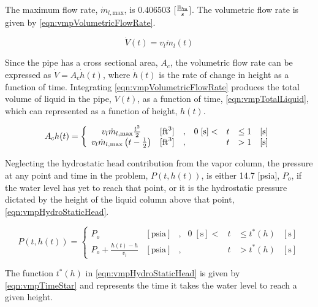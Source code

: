 The maximum flow rate, $\dot{m}_{l,\text{max}}$, is 0.406503 $ [ \frac{\lbm{}}{s} ]$.
The volumetric flow rate is given by \eqref{eqn:vmpVolumetricFlowRate}.

\begin{equation}
\label{eqn:vmpVolumetricFlowRate}
\dot{V}(t) = v_{l} \dot{m}_{l}(t)
\end{equation}

Since the pipe has a cross sectional area, $A_{c}$, the volumetric flow rate can be expressed as $\dot{V} = A_{c} \dot{h}(t)$, where $\dot{h}(t)$ is the rate of change in height as a function of time.
Integrating \eqref{eqn:vmpVolumetricFlowRate} produces the total volume of liquid in the pipe, $V(t)$, as a function of time, \eqref{eqn:vmpTotalLiquid}, which can represented as a function of height, $h(t)$.

\begin{equation}
\label{eqn:vmpTotalLiquid}
A_{c} h(t) = 
 \left\{
\begin{array}{cclrcll}
v_{l} \dot{m}_{l,\text{max}}\frac{t^{2}}{2} & [ \text{ft}^{3} ] & , & 0\; [\text{s}] < & t & \leq 1 & [\text{s}] \\
v_{l} \dot{m}_{l,\text{max}} \left( t - \onehalf  \right) & [ \text{ft}^{3} ] & , &                  & t & > 1    & [\text{s}]
\end{array}\right.
\end{equation}

Neglecting the hydrostatic head contribution from the vapor column, the pressure at any point and time in the problem, $P(t, h(t))$, is either 14.7 [psia], $P_o$, if the water level has yet to reach that point, or it is the hydrostatic pressure dictated by the height of the liquid column above that point, \eqref{eqn:vmpHydroStaticHead}.

\begin{equation}
\label{eqn:vmpHydroStaticHead}
P(t, h(t))= 
 \left\{
\begin{array}{cclrcll}
P_o & [ \text{psia} ] & , & 0\; [\text{s}] < & t & \leq t^{*}(h) & [\text{s}] \\
P_o + \frac{ h(t) - h }{ v_{l} } & [ \text{psia} ] & , &  & t & > t^{*}(h) & [\text{s}]
\end{array}\right.
\end{equation}

The function $t^{*}(h)$ in \eqref{eqn:vmpHydroStaticHead} is given by \eqref{eqn:vmpTimeStar} and represents the time it takes the water level to reach a given height.

